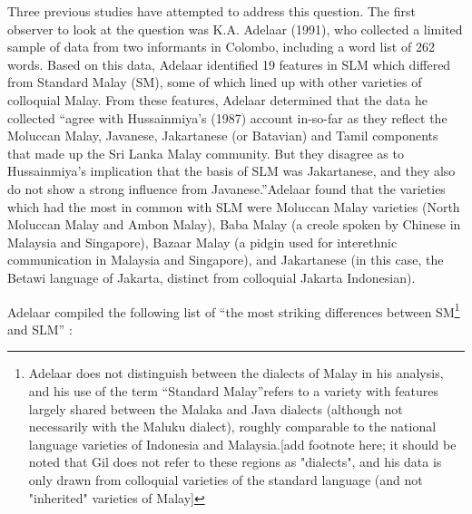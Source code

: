 Three previous studies have attempted to address this question. The first observer to look at the question was K.A. Adelaar (1991), who collected a limited sample of data from two informants in Colombo, including a word list of 262 words. Based on this data, Adelaar identified 19 features in SLM which differed from Standard Malay (SM), some of which lined up with other varieties of colloquial Malay. From these features, Adelaar determined that the data he collected ``agree with Hussainmiya's (1987) account in-so-far as they reflect the Moluccan Malay, Javanese, Jakartanese (or Batavian) and Tamil components that made up the Sri Lanka Malay community. But they disagree as to Hussainmiya's implication that the basis of SLM was Jakartanese, and they also do not show a strong influence from Javanese.''Adelaar found that the varieties which had the most in common with SLM were Moluccan Malay varieties (North Moluccan Malay and Ambon Malay), Baba Malay (a creole spoken by Chinese in Malaysia and Singapore), Bazaar Malay (a pidgin used for interethnic communication in Malaysia and Singapore), and Jakartanese (in this case, the Betawi language of Jakarta, distinct from colloquial Jakarta Indonesian). 

Adelaar compiled the following list of ``the most striking differences between SM\footnote{Adelaar
 does not distinguish between the dialects of Malay in his analysis, and his use of the term ``Standard Malay''refers to a variety with features largely shared between the Malaka and Java dialects (although not necessarily with the Maluku dialect), roughly comparable to the national language varieties of Indonesia and Malaysia.[add footnote here; it should be noted that Gil does not refer to these regions as "dialects", and his data is only drawn from colloquial varieties of the standard language (and not "inherited" varieties of Malay] 
} 
and SLM'' \citep[25-26]{Adelaar1991}:

